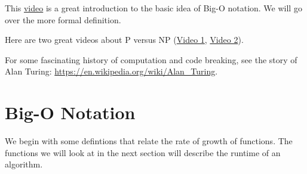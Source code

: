            

This \href{https://youtu.be/__vX2sjlpXU}{video} is a great introduction to the basic idea of Big-O notation.  We will go over the more formal definition.

    

Here are two great videos about P versus NP (\href{https://youtu.be/EHp4FPyajKQ}{Video 1}, \href{https://youtu.be/YX40hbAHx3s}{Video 2}).  
%

         

For some fascinating history of computation and code breaking, see the story of Alan Turing: \url{https://en.wikipedia.org/wiki/Alan_Turing}.

\section{Big-O Notation}
We begin with some defintions that relate the rate of growth of functions.   The functions we will look at in the next section will describe the runtime of an algorithm.  


